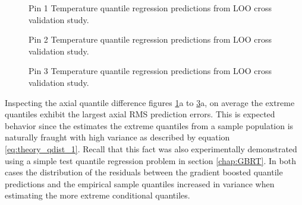 \begin{figure}[H]%
    \centering
    \qquad
    \caption[Q-Q LOO Temperature pin 1 results.]{Pin 1 Temperature quantile regression predictions from LOO cross validation study.}%
    \label{fig:temppin1}%
\end{figure}

\begin{figure}[H]%
    \centering
    \qquad
    \caption[Q-Q LOO Temperature pin 2 results.]{Pin 2 Temperature quantile regression predictions from LOO cross validation study.}%
    \label{fig:temppin2}%
\end{figure}

\begin{figure}[H]%
    \centering
    \qquad
    \caption[Q-Q LOO Temperature pin 3 results.]{Pin 3 Temperature quantile regression predictions from LOO cross validation study.}%
    \label{fig:temppin3}%
\end{figure}

Inspecting the axial quantile difference figures \ref{fig:temppin1}a to \ref{fig:temppin3}a, on average the extreme quantiles exhibit the largest axial RMS prediction errors.  This is expected behavior since the estimates the extreme quantiles from a sample population is naturally fraught with high variance as described by equation \ref{eq:theory_qdist_1}.  Recall that this fact was also experimentally demonstrated using a simple test quantile regression problem in section \ref{chap:GBRT}.  In both cases the distribution of the residuals between the gradient boosted quantile predictions and the empirical sample quantiles increased in variance when estimating the more extreme conditional quantiles.


